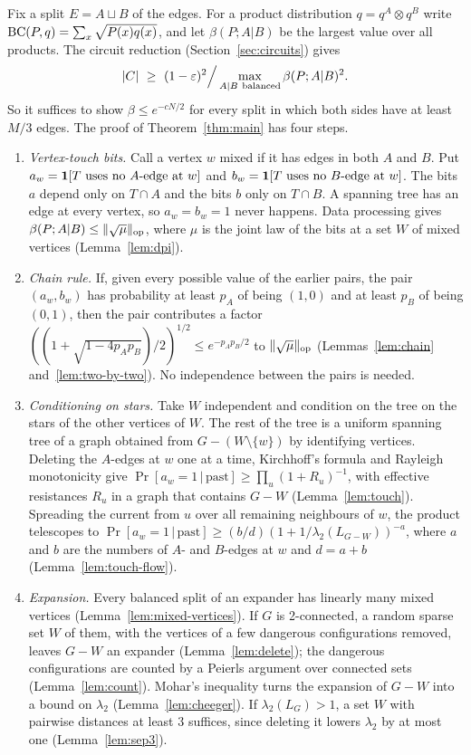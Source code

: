 Fix a split $E=A\sqcup B$ of the edges. For a product distribution $q=q^A\otimes q^B$ write $\mathrm{BC}(P,q)=\sum_x\sqrt{P(x)q(x)}$, and let $\beta(P;A|B)$ be the largest value over all products. The circuit reduction (Section~\ref{sec:circuits}) gives
\[
  \abs C\ \ge\ (1-\eps)^2\Big/\max_{A|B\ \text{balanced}}\beta(P;A|B)^2 .
\]
So it suffices to show $\beta\le e^{-cN/2}$ for every split in which both sides have at least $M/3$ edges. The proof of Theorem~\ref{thm:main} has four steps.
\begin{enumerate}
\item \emph{Vertex-touch bits.} Call a vertex $w$ mixed if it has edges in both $A$ and $B$. Put $a_w=\mathbf{1}[T\text{ uses no }A\text{-edge at }w]$ and $b_w=\mathbf{1}[T\text{ uses no }B\text{-edge at }w]$. The bits $a$ depend only on $T\cap A$ and the bits $b$ only on $T\cap B$. A spanning tree has an edge at every vertex, so $a_w=b_w=1$ never happens. Data processing gives $\beta(P;A|B)\le\lVert \sqrt\mu\rVert_{\mathrm{op}}$, where $\mu$ is the joint law of the bits at a set $W$ of mixed vertices (Lemma~\ref{lem:dpi}).
\item \emph{Chain rule.} If, given every possible value of the earlier pairs, the pair $(a_w,b_w)$ has probability at least $p_A$ of being $(1,0)$ and at least $p_B$ of being $(0,1)$, then the pair contributes a factor $((1+\sqrt{1-4p_Ap_B})/2)^{1/2}\le e^{-p_Ap_B/2}$ to $\lVert \sqrt\mu\rVert_{\mathrm{op}}$ (Lemmas~\ref{lem:chain} and~\ref{lem:two-by-two}). No independence between the pairs is needed.
\item \emph{Conditioning on stars.} Take $W$ independent and condition on the tree on the stars of the other vertices of $W$. The rest of the tree is a uniform spanning tree of a graph obtained from $G-(W\setminus\{w\})$ by identifying vertices. Deleting the $A$-edges at $w$ one at a time, Kirchhoff's formula and Rayleigh monotonicity give $\Pr[a_w=1\,|\,\text{past}]\ge\prod_u(1+R_u)^{-1}$, with effective resistances $R_u$ in a graph that contains $G-W$ (Lemma~\ref{lem:touch}). Spreading the current from $u$ over all remaining neighbours of $w$, the product telescopes to $\Pr[a_w=1\,|\,\text{past}]\ge(b/d)(1+1/\lambda_2(L_{G-W}))^{-a}$, where $a$ and $b$ are the numbers of $A$- and $B$-edges at $w$ and $d=a+b$ (Lemma~\ref{lem:touch-flow}).
\item \emph{Expansion.} Every balanced split of an expander has linearly many mixed vertices (Lemma~\ref{lem:mixed-vertices}). If $G$ is 2-connected, a random sparse set $W$ of them, with the vertices of a few dangerous configurations removed, leaves $G-W$ an expander (Lemma~\ref{lem:delete}); the dangerous configurations are counted by a Peierls argument over connected sets (Lemma~\ref{lem:count}). Mohar's inequality turns the expansion of $G-W$ into a bound on $\lambda_2$ (Lemma~\ref{lem:cheeger}). If $\lambda_2(L_G)>1$, a set $W$ with pairwise distances at least $3$ suffices, since deleting it lowers $\lambda_2$ by at most one (Lemma~\ref{lem:sep3}).
\end{enumerate}
